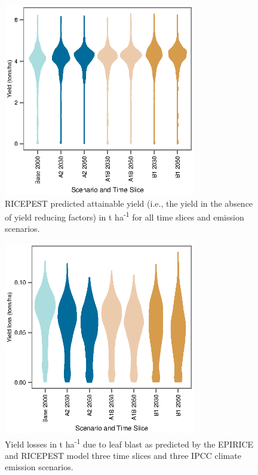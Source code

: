     \begin{figure}
      \includegraphics[width = 84mm]{figures/Fig4}
      \caption{RICEPEST predicted attainable yield (i.e., the yield in the absence of yield reducing factors) in t ha\textsuperscript{-1} for all time slices and emission scenarios.}
      \label{Fig4}
    \end{figure}

    \begin{figure}
      \includegraphics[width = 84mm]{Figures/Fig5}
      \caption{Yield losses in t ha\textsuperscript{-1} due to leaf blast as predicted by the EPIRICE and RICEPEST model three time slices and three IPCC climate emission scenarios.}
      \label{Fig5}
    \end{figure}

